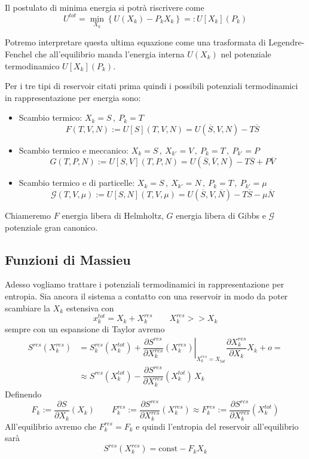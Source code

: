 \documentclass[11pt,a4paper,twoside]{book}
\newenvironment{importante}[1][~]{ 
  \begin{center}\begin{tcolorbox}[enhanced,
  before skip=2mm,after skip=3mm,
  boxrule=0.4pt,left=5mm,right=2mm,top=1mm,bottom=1mm,
  colback=white,
  colframe=white!20!black,
  sharp corners,arc=3mm,
  underlay={
  	\path[fill=red!50!black,draw=none] (interior.south west) rectangle 			
  	node[white]{\Huge\bfseries !} ([xshift=4mm]interior.north west);
  },
  drop fuzzy shadow]
 {\ifx\empty#1\relax\else\mdseries\bfseries#1\\\fi}
 \normalsize 
  }{
	\end{tcolorbox}\end{center}
}
\numberwithin{equation}{section} %
\begin{document}
\begin{importante}
Il postulato di minima energia si potrà riscrivere come
\begin{equation}
U^{tot}=\min_{X_k}\left\{ U(X_k) - P_k X_k \right\} =: U[X_k](P_k)
\end{equation}
\end{importante}


Potremo interpretare questa ultima equazione come una trasformata di Legendre-Fenchel che all'equilibrio manda l'energia interna $U(X_k)$ nel potenziale termodinamico $U[X_k](P_k)$.

Per i tre tipi di reservoir citati prima quindi i possibili potenziali termodinamici in rappresentazione per energia sono:
\begin{itemize}[label=$\cdot$]
\item Scambio termico: $X_k=S\, , \> P_k=T$
\[
F(T,V,N) := U[S](T,V,N) = U(\overline{S},V,N)-T\overline{S}
\]
\item Scambio termico e meccanico: $X_k=S\, ,\> X_{k'}=V\, , \> P_k=T\, , \> P_{k'}=P$
\[
G(T,P,N) := U[S,V](T,P,N) = U(\overline{S},\overline{V},N)-T\overline{S}+P\overline{V}
\]
\item Scambio termico e di particelle: $X_k=S\, ,\> X_{k'}=N\, , \> P_k=T\, , \> P_{k'}=\mu$
\[
\mathcal{G}(T,V,\mu) := U[S,N](T,V,\mu)=U(\overline{S},V,\overline{N})-T\overline{S}-\mu\overline{N}
\]
\end{itemize}
Chiameremo $F$ energia libera di Helmholtz, $G$ energia libera di Gibbs e $\mathcal{G}$ potenziale gran canonico.

\subsection{Funzioni di Massieu}

Adesso vogliamo trattare i potenziali termodinamici in rappresentazione per entropia.
Sia ancora il sistema a contatto con una reservoir in modo da poter scambiare la $X_k$ estensiva con
\[
x_k^{tot}=X_k+X_k^{res}\qquad X_k^{res}>>X_k
\]
sempre con un espansione di Taylor avremo
\begin{align*}
S^{res}(X_k^{res}) &= 
S^{res}_{k}(X_k^{tot}) + \left.\dfrac{\partial S^{res}}{\partial X_k^{res}}(X_k^{res})\right|_{X_k^{res}=X_{tot}} \dfrac{\partial X_k^{res}}{\partial X_k} X_k + o = \\
&\approx S^{res}(X_k^{tot}) - \dfrac{\partial S^{res}}{\partial X_k^{res}}(X_k^{tot})\,X_k 
\end{align*}
Definendo
\[
F_k:=\dfrac{\partial S}{\partial X_k}(X_k) \qquad 
F_k^{res}:=\dfrac{\partial S^{res}}{\partial X_k^{res}}(X_k^{res}) \approx 
F_k^{res}:=\dfrac{\partial S^{res}}{\partial X_k^{res}}(X_k^{tot})
\]
All'equilibrio avremo che $F_k^{res}=F_k$ e quindi l'entropia del reservoir all'equilibrio sarà
\begin{equation}\label{espansioneEntropia}
S^{res}(X_k^{res}) = \text{const} - F_k X_k
\end{equation}
\end{document}
